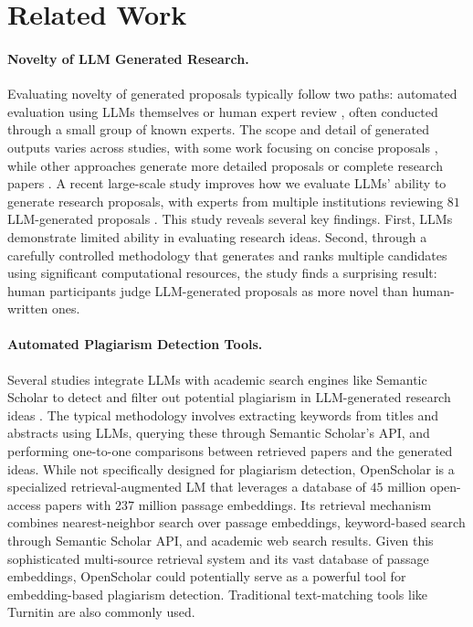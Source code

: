 \section{Related Work}
\label{sec:related}

\paragraph{Novelty of LLM Generated Research.} 
Evaluating 
novelty of 
generated proposals 
typically follow two paths: automated evaluation using LLMs themselves \citep{lu2024ai} or human expert review \citep{li2024chain, baek2024researchagent, li2024mlr, wang2023scimon, yang2023large, li2024learning, weng2024cycleresearcher}, often 
conducted 
through 
a small group of known experts. The scope and detail of generated outputs varies across studies, with some work focusing on concise proposals \citep{wang2023scimon,yang2023large}, while other approaches generate more detailed proposals or complete research papers \citep{si2024can,lu2024ai}. 
A recent large-scale study improves how we evaluate LLMs' ability to generate research proposals, with experts from multiple institutions reviewing $81$ LLM-generated proposals \citep{si2024can}. 
This study reveals several key findings. First, LLMs demonstrate limited ability in evaluating research ideas. Second, through a carefully controlled methodology that generates and ranks multiple candidates using significant computational resources, the study finds a surprising result: human participants judge LLM-generated proposals as more novel than human-written ones.

\paragraph{Automated Plagiarism Detection Tools.} \label{para:rel-automated-plag-tools}
Several studies integrate LLMs with academic search engines like Semantic Scholar to detect and filter out potential plagiarism in LLM-generated research ideas \citep{si2024can, lu2024ai, li2024chain}. The typical methodology  involves extracting keywords from titles and abstracts using LLMs, querying these through Semantic Scholar's API, and performing one-to-one comparisons between retrieved papers and the generated ideas. While not specifically designed for plagiarism detection, OpenScholar \citep{asai2024openscholar} is a specialized retrieval-augmented LM that leverages a database of $45$ million open-access papers with $237$ million passage embeddings. Its retrieval mechanism combines nearest-neighbor search over passage embeddings, keyword-based search through Semantic Scholar API, and academic web search results. Given this sophisticated multi-source retrieval system and its vast database of passage embeddings, OpenScholar could potentially serve as a powerful tool for embedding-based plagiarism detection. Traditional text-matching tools like Turnitin are also commonly used.

